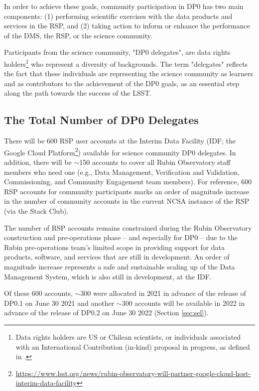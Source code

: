 \documentclass[DM,lsstdraft,authoryear,toc]{lsstdoc}
\begin{document}
In order to achieve these goals, community participation in DP0 has two main components:
(1) performing scientific exercises with the data products and services in the RSP, and
(2) taking action to inform or enhance the performance of the DMS, the RSP, or the science community.

Participants from the science community, "DP0 delegates", are data rights holders\footnote{Data rights holders are US or Chilean scientists, or individuals associated with an International Contribution (in-kind) proposal in progress, as defined in .} who represent a diversity of backgrounds.
The term "delegates" reflects the fact that these individuals are representing the science community as learners and as contributors to the achievement of the DP0 goals, as an essential step along the path towards the success of the LSST. 


\subsection{The Total Number of DP0 Delegates}

There will be 600 RSP user accounts at the Interim Data Facility (IDF; the Google Cloud Platform\footnote{\url{https://www.lsst.org/news/rubin-observatory-will-partner-google-cloud-host-interim-data-facility}}) available for science community DP0 delegates.
In addition, there will be $\sim$150 accounts to cover all Rubin Observatory staff members who need one (e.g., Data Management, Verification and Validation, Commissioning, and Community Engagement team members).
For reference, 600 RSP accounts for community participants marks an order of magnitude increase in the number of community accounts in the current NCSA instance of the RSP (via the Stack Club).

The number of RSP accounts remains constrained during the Rubin Observatory construction and pre-operations phase -- and especially for DP0 -- due to the Rubin pre-operations team's limited scope in providing support for data products, software, and services that are still in development.
An order of magnitude increase represents a safe and sustainable scaling up of the Data Management System, which is also still in development, at the IDF.

Of these 600 accounts, $\sim$300 were allocated in 2021 in advance of the release of DP0.1 on June 30 2021 and another $\sim$300 accounts will be available in 2022 in advance of the release of DP0.2 on June 30 2022 (Section \ref{sec:sel}).
\end{document}
